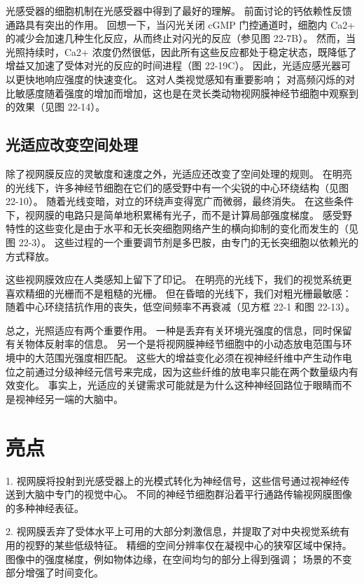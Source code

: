 光感受器的细胞机制在光感受器中得到了最好的理解。 前面讨论的钙依赖性反馈通路具有突出的作用。 回想一下，当闪光关闭 cGMP 门控通道时，细胞内 Ca2+ 的减少会加速几种生化反应，从而终止对闪光的反应（参见图 22-7B）。 然而，当光照持续时，Ca2+ 浓度仍然很低，因此所有这些反应都处于稳定状态，既降低了增益又加速了受体对光的反应的时间进程（图 22-19C）。 因此，光适应感光器可以更快地响应强度的快速变化。 这对人类视觉感知有重要影响； 对高频闪烁的对比敏感度随着强度的增加而增加，这也是在灵长类动物视网膜神经节细胞中观察到的效果（见图 22-14）。

\subsection{光适应改变空间处理}

除了视网膜反应的灵敏度和速度之外，光适应还改变了空间处理的规则。 在明亮的光线下，许多神经节细胞在它们的感受野中有一个尖锐的中心环绕结构（见图 22-10）。 随着光线变暗，对立的环绕声变得宽广而微弱，最终消失。 在这些条件下，视网膜的电路只是简单地积累稀有光子，而不是计算局部强度梯度。 感受野特性的这些变化是由于水平和无长突细胞网络产生的横向抑制的变化而发生的（见图 22-3）。 这些过程的一个重要调节剂是多巴胺，由专门的无长突细胞以依赖光的方式释放。

这些视网膜效应在人类感知上留下了印记。 在明亮的光线下，我们的视觉系统更喜欢精细的光栅而不是粗糙的光栅。 但在昏暗的光线下，我们对粗光栅最敏感：随着中心环绕拮抗作用的丧失，低空间频率不再衰减（见方框 22-1 和图 22-13）。

总之，光照适应有两个重要作用。 一种是丢弃有关环境光强度的信息，同时保留有关物体反射率的信息。 另一个是将视网膜神经节细胞中的小动态放电范围与环境中的大范围光强度相匹配。 这些大的增益变化必须在视神经纤维中产生动作电位之前通过分级神经元信号来完成，因为这些纤维的放电率只能在两个数量级内有效变化。 事实上，光适应的关键需求可能就是为什么这种神经回路位于眼睛而不是视神经另一端的大脑中。

\section{亮点}

1. 视网膜将投射到光感受器上的光模式转化为神经信号，这些信号通过视神经传送到大脑中专门的视觉中心。 不同的神经节细胞群沿着平行通路传输视网膜图像的多种神经表征。 

2. 视网膜丢弃了受体水平上可用的大部分刺激信息，并提取了对中央视觉系统有用的视野的某些低级特征。 精细的空间分辨率仅在凝视中心的狭窄区域中保持。 图像中的强度梯度，例如物体边缘，在空间均匀的部分上得到强调； 场景的不变部分增强了时间变化。 

